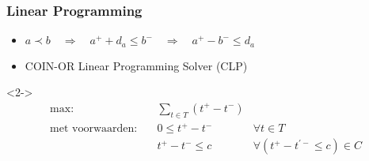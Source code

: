 \begin{frame}\frametitle{Linear Programming}
    \begin{itemize}
        \item<1-> $a \prec b \quad \Rightarrow \quad a^+ + d_a \leq b^- \quad \Rightarrow \quad a^+ - b^- \leq d_a$ 
        \item<3-> COIN-OR Linear Programming Solver (CLP)
    \end{itemize}

    \begin{definitie}<2->
        \begin{align}
            \text{max:}& \quad \sum_{t \in T} (t^+ - t^-) & \nonumber \\
            \text{met voorwaarden:} & \quad 0 \leq t^+ - t^- & \forall t \in T \nonumber \\
                                    & \quad t^+ - t^- \leq c & \forall (t^+ - t^{'-} \leq c) \in C \nonumber
        \end{align}
    \end{definitie}
\end{frame}
